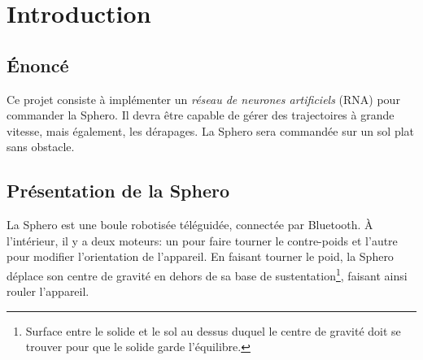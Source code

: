\section{Introduction}
\subsection{Énoncé}
Ce projet consiste à implémenter un \emph{réseau de neurones artificiels} \hypertarget{rna}{(RNA)} pour commander la Sphero.
Il devra être capable de gérer des trajectoires à grande vitesse, mais également, les dérapages.
La Sphero sera commandée sur un sol plat sans obstacle.
\subsection{Présentation de la Sphero}
La Sphero est une boule robotisée téléguidée, connectée par Bluetooth.
À l'intérieur, il y a deux moteurs: un pour faire tourner le contre-poids et l'autre pour modifier l'orientation de l'appareil.
En faisant tourner le poid, la Sphero déplace son centre de gravité en dehors de sa base de sustentation\footnote{Surface entre le solide et le sol au dessus duquel le centre de gravité doit se trouver pour que le solide garde l'équilibre.}, faisant ainsi rouler l'appareil.
